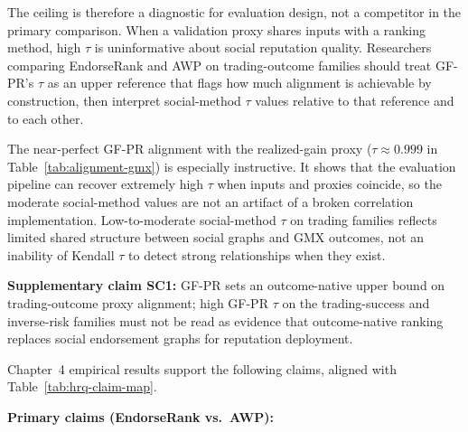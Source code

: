 The ceiling is therefore a diagnostic for evaluation design, not a competitor in the primary comparison. When a validation proxy shares inputs with a ranking method, high $\tau$ is uninformative about social reputation quality. Researchers comparing EndorseRank and AWP on trading-outcome families should treat GF-PR's $\tau$ as an upper reference that flags how much alignment is achievable by construction, then interpret social-method $\tau$ values relative to that reference and to each other.

The near-perfect GF-PR alignment with the realized-gain proxy ($\tau \approx 0.999$ in Table~\ref{tab:alignment-gmx}) is especially instructive. It shows that the evaluation pipeline can recover extremely high $\tau$ when inputs and proxies coincide, so the moderate social-method values are not an artifact of a broken correlation implementation. Low-to-moderate social-method $\tau$ on trading families reflects limited shared structure between social graphs and GMX outcomes, not an inability of Kendall $\tau$ to detect strong relationships when they exist.

\textbf{Supplementary claim SC1:} GF-PR sets an outcome-native upper bound on trading-outcome proxy alignment; high GF-PR $\tau$ on the trading-success and inverse-risk families must not be read as evidence that outcome-native ranking replaces social endorsement graphs for reputation deployment.


Chapter~4 empirical results support the following claims, aligned with Table~\ref{tab:hrq-claim-map}.

\textbf{Primary claims (EndorseRank vs.\ AWP):}

